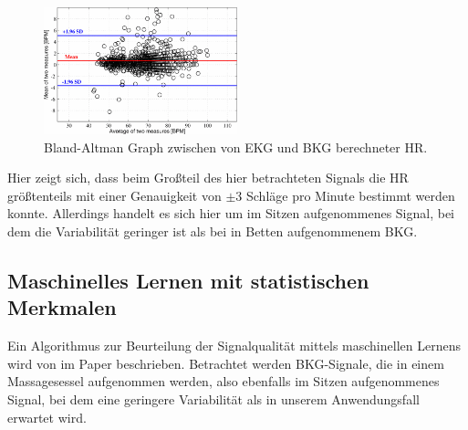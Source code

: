 	\begin{figure}[H]
		\centering
		\includegraphics[width=0.5\textwidth]{pic/bland-altman-pino.png}
		\caption[Genauigkeit der Herzratenberechnung bei schwellwertbasierter Artefakterkennung]{Bland-Altman Graph zwischen von \ac{EKG} und \ac{BKG} berechneter \ac{HR}.}
		\label{fig:bland-altman-pino}
	\end{figure}
	
	Hier zeigt sich, dass beim Großteil des hier betrachteten Signals die \ac{HR} größtenteils mit einer Genauigkeit von $\pm 3$ Schläge pro Minute bestimmt werden konnte. Allerdings handelt es sich hier um im Sitzen aufgenommenes Signal, bei dem die Variabilität geringer ist als bei in Betten aufgenommenem \ac{BKG}.
	
	
	\subsection{Maschinelles Lernen mit statistischen Merkmalen}
	
	Ein Algorithmus zur Beurteilung der Signalqualität mittels maschinellen Lernens wird von \citeauthor{Sadek2016} im Paper  beschrieben. Betrachtet werden \ac{BKG}-Signale, die in einem Massagesessel aufgenommen werden, also ebenfalls im Sitzen aufgenommenes Signal, bei dem eine geringere Variabilität als in unserem Anwendungsfall erwartet wird.
	
